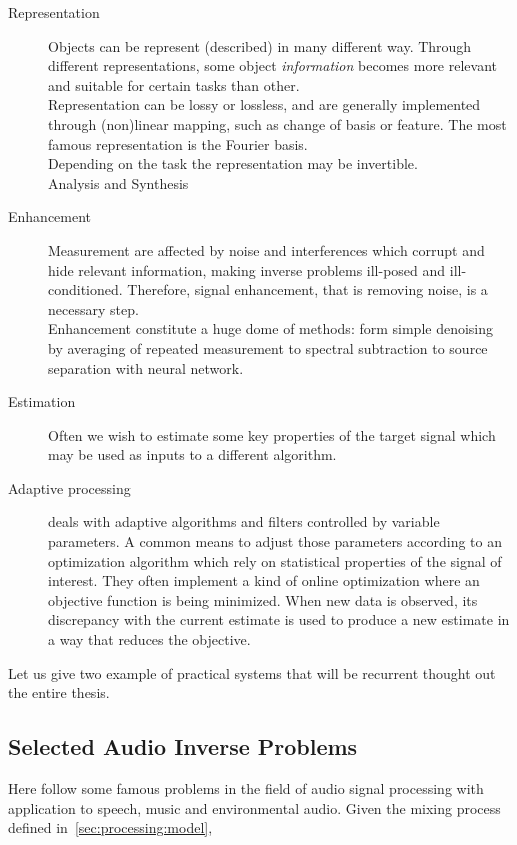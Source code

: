 \begin{description}
    \item[Representation] Objects can be represent (described) in many different way.
    Through different representations, some object \textit{information} becomes more relevant and suitable for certain tasks
    than other.
    \\Representation can be lossy or lossless, and are generally implemented through (non)linear mapping, such as change of basis or feature.
    The most famous representation is the Fourier basis.
    \\Depending on the task the representation may be invertible.
    \\Analysis and Synthesis

    \item[Enhancement] Measurement are affected by noise and interferences which corrupt and hide relevant information, making inverse problems ill-posed and ill-conditioned.
    Therefore, signal enhancement, that is removing noise, is a necessary step.
    \\Enhancement constitute a huge dome of methods: form simple denoising by averaging of repeated measurement to
    spectral subtraction to source separation with neural network.

    \item[Estimation] Often we wish to estimate some key properties of the target signal which may be used as inputs to a different algorithm.

    \item[Adaptive processing] deals with adaptive algorithms and filters controlled by variable parameters.
    A common means to adjust those parameters according to an optimization algorithm which rely on statistical properties of the signal of interest.
    They often implement a kind of online optimization where an objective function is being minimized.
    When new data is observed, its discrepancy with the current estimate is used to produce a new estimate in a way that reduces the objective.
\end{description}

Let us give two example of practical systems that will be recurrent thought out the entire thesis.

\subsection{Selected Audio Inverse Problems}
Here follow some famous problems in the field of audio signal processing with application to speech, music and environmental audio.
Given the mixing process defined in~\cref{sec:processing:model},

